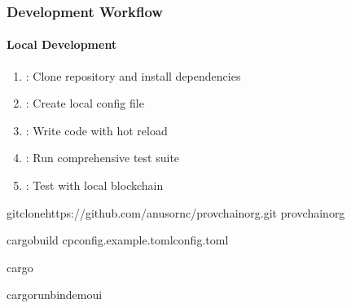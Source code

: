 \documentclass[letterpaper,10pt,english]{sphinxmanual}
\begin{document}
\subsubsection{Development Workflow}
\label{\detokenize{stack/intro-to-stack:development-workflow}}

\paragraph{Local Development}
\label{\detokenize{stack/intro-to-stack:local-development}}\begin{enumerate}
%
\item {} 
\sphinxAtStartPar
{}: Clone repository and install dependencies

\item {} 
\sphinxAtStartPar
{}: Create local config file

\item {} 
\sphinxAtStartPar
{}: Write code with hot reload

\item {} 
\sphinxAtStartPar
{}: Run comprehensive test suite

\item {} 
\sphinxAtStartPar
{}: Test with local blockchain

\end{enumerate}

\begin{sphinxVerbatim}[commandchars=\\\{\}]
gitclonehttps://github.com/anusornc/provchain\PYGZhy{}org.git
provchain\PYGZhy{}org

cargobuild
cpconfig.example.tomlconfig.toml

cargo

cargorun\PYGZhy{}\PYGZhy{}bindemo\PYGZus{}ui
\end{sphinxVerbatim}
\end{document}
